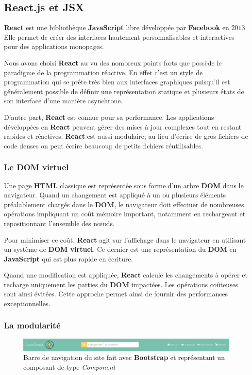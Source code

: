 \documentclass[a4paper,12pt]{report}
\theoremstyle{break}
\theoremstyle{break}
\theoremstyle{break}
\theoremstyle{break}
\theoremstyle{definition}
\theoremstyle{remark}
\begin{document}
\subsection{React.js et JSX}
\textbf{React} est une bibliothèque \textbf{JavaScript} libre développée par \textbf{Facebook} en $2013$. Elle permet de créer des interfaces hautement personnalisables et interactives pour des applications monopages.

Nous avons choisi \textbf{React} au vu des nombreux points forts que possède le paradigme de la programmation réactive. En effet c’est un style de programmation qui se prête très bien aux interfaces graphiques puisqu’il est généralement possible de définir une représentation statique et plusieurs états de son interface d'une manière asynchrone.

D’autre part, \textbf{React} est connue pour sa performance. Les applications développées en \textbf{React} peuvent gérer des mises à jour complexes tout en restant rapides et réactives. \textbf{React} est aussi modulaire; au lieu d’écrire de gros fichiers de code denses on peut écrire beaucoup de petits fichiers réutilisables.

\subsubsection{Le DOM virtuel}
Une page \textbf{HTML} classique est représentée sous forme d'un arbre \textbf{DOM} dans le navigateur. Quand un changement est appliqué à un ou plusieurs éléments préalablement chargés dans le \textbf{DOM}, le navigateur doit effectuer de nombreuses opérations impliquant un coût mémoire important, notamment en rechargeant et repositionnant l’ensemble des n\oe{}uds.

Pour minimiser ce coût, \textbf{React} agit sur l’affichage dans le navigateur en utilisant un système de \textbf{DOM virtuel}. Ce dernier est une représentation du \textbf{DOM} en \textbf{JavaScript} qui est plus rapide en écriture.

Quand une modification est appliquée, \textbf{React} calcule les changements à opérer et recharge uniquement les parties du \textbf{DOM} impactées. Les opérations coûteuses sont ainsi évitées. Cette approche permet ainsi de fournir des performances exceptionnelles.

\subsubsection{La modularité}
\begin{figure}[!ht]
  \centering
  \includegraphics[scale=0.35]{images/header_navbar_component.png}
  \caption{Barre de navigation du site fait avec \textbf{Bootstrap} et représentant un composant de type \textit{Component}}
  \label{fig:header_navbar_component}
\end{figure}
\end{document}
